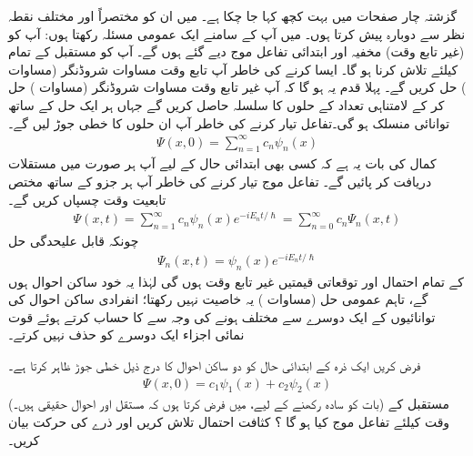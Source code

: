 گزشتہ چار صفحات میں بہت کچھ کہا جا چکا ہے۔ میں ان کو مختصراً اور مختلف نقطہ نظر سے دوبارہ پیش کرتا ہوں۔ میں آپ کے سامنے ایک عمومی مسئلہ رکھتا ہوں: آپ کو (غیر تابع وقت) مخفیہ  اور ابتدائی تفاعل موج  دیے گئے ہوں گے۔ آپ کو مستقبل کے تمام  کیلئے  تلاش کرنا ہو گا۔ ایسا کرنے کی خاطر آپ تابع وقت مساوات شروڈنگر (مساوات ) حل کریں گے۔ پہلا قدم یہ ہو گا کہ آپ غیر تابع وقت مساوات شروڈنگر (مساوات ) حل کر کے لامتناہی تعداد کے حلوں کا سلسلہ  حاصل کریں گے جہاں ہر ایک   حل کے ساتھ توانائی   منسلک ہو گی۔تفاعل  تیار کرنے کی خاطر آپ ان حلوں کا خطی جوڑ لیں گے۔
\begin{align}\label{مساوات_شروڈنگر_ساکن_حالات_کا_خطی_جوڑ}
\Psi (x,0) = \sum_{n=1}^{\infty} c_{n} \psi_{n}(x)
\end{align}
کمال کی بات یہ ہے کہ کسی بھی ابتدائی حال کے لیے آپ ہر صورت میں مستقلات   دریافت کر پائیں گے۔ تفاعل موج  تیار کرنے کی خاطر آپ ہر جزو کے ساتھ مختص تابعیت وقت  چسپاں کریں گے۔ 
\begin{align}\label{مساوات_شروڈنگر_عمومی_حل_مجموعہ}
\Psi (x,t) = \sum_{n=1}^{\infty} c_{n} \psi_{n}(x)e^{-iE_{n}t/\hslash} = \sum_{n=0}^{\infty} c_{n} \Psi_{n} (x,t)
\end{align}
چونکہ قابل علیحدگی حل
\begin{align}\label{مساوات_شروڈنگر_تمام_عمومی_حل}
\Psi_{n} (x,t) = \psi_{n}(x) e^{-iE_{n}t/\hslash}
\end{align}
کے تمام احتمال اور توقعاتی قیمتیں غیر تابع وقت ہوں گی لہٰذا یہ خود ساکن احوال ہوں گے،  تاہم عمومی حل (مساوات )  یہ خاصیت نہیں رکھتا؛ انفرادی ساکن احوال کی توانائیوں کے ایک دوسرے سے مختلف ہونے کی وجہ سے  کا حساب کرتے ہوئے قوت نمائی اجزاء  ایک دوسرے کو حذف نہیں کرتے۔ 


فرض کریں ایک ذرہ کے ابتدائی حال کو دو ساکن احوال کا  درج ذیل خطی جوڑ  ظاہر کرتا   ہے۔
\begin{align*}
\Psi (x,0) = c_{1} \psi_{1}(x) + c_{2} \psi_{2}(x) 
\end{align*}
(بات  کو سادہ رکھنے کے لیے،   میں فرض کرتا ہوں کہ مستقل  اور احوال  حقیقی ہیں۔) مستقبل  کے وقت  کیلئے تفاعل موج  کیا ہو گا ؟ کثافت احتمال تلاش کریں اور ذرے کی حرکت بیان کریں۔ 

